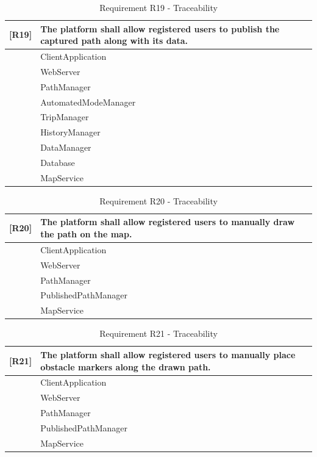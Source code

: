 \begin{table}[H]
    \centering
    \begin{tabular}{|p{1cm}|p{14cm}|}
    \hline
    \textbf{[R19]} & \textbf{The platform shall allow registered users to publish the captured path along with its data.} \\ \hline
    [C1] & ClientApplication \\ \hline
    [C2] & WebServer \\ \hline
    [C7] & PathManager \\ \hline
    [C8] & AutomatedModeManager \\ \hline
    [C11] & TripManager \\ \hline
    [C12] & HistoryManager \\ \hline
    [C15] & DataManager\\ \hline
    [C16] & Database\\ \hline
    [E2] & MapService \\ \hline
    \end{tabular}
    \caption{Requirement R19 - Traceability}
    \label{tab:RT19}
\end{table}

\begin{table}[H]
    \centering
    \begin{tabular}{|p{1cm}|p{14cm}|}
    \hline
    \textbf{[R20]} & \textbf{The platform shall allow registered users to manually draw the path on the map.} \\ \hline
    [C1] & ClientApplication\\ \hline
    [C2] & WebServer \\ \hline
    [C7] & PathManager \\ \hline
    [C9] & PublishedPathManager \\ \hline
    [E2] & MapService \\ \hline
    \end{tabular}
    \caption{Requirement R20 - Traceability}
    \label{tab:RT20}
\end{table}

\begin{table}[H]
    \centering
    \begin{tabular}{|p{1cm}|p{14cm}|}
    \hline
    \textbf{[R21]} & \textbf{The platform shall allow registered users to manually place obstacle markers along the drawn
    path.} \\ \hline
    [C1] & ClientApplication \\ \hline
    [C2] & WebServer \\ \hline
    [C7] & PathManager \\ \hline
    [C9] & PublishedPathManager \\ \hline
    [E2] & MapService \\ \hline
    \end{tabular}
    \caption{Requirement R21 - Traceability}
    \label{tab:RT21}
\end{table}

